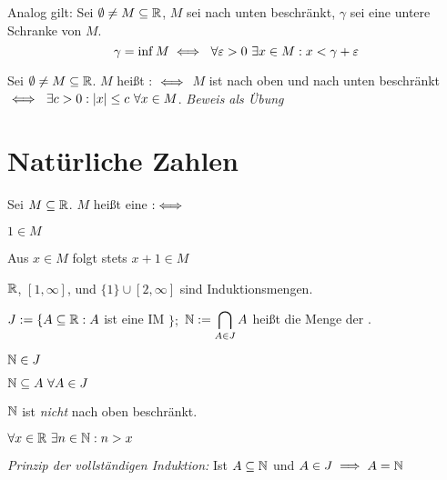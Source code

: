 \documentclass[a4paper,twoside,DIV15,BCOR12mm]{scrbook}
\begin{document}
Analog gilt: Sei $\emptyset \ne M \subseteq \mathbb{R}$, $M$ sei nach unten beschränkt, $\gamma$ sei eine untere Schranke von $M$.
\[ \gamma = \inf{M} \equizu \ \forall\varepsilon > 0 \ \exists x \in M: x < \gamma + \varepsilon \]

\begin{definition}
Sei $\emptyset \ne M \subseteq \mathbb{R}$. $M$ heißt : $\iff$ $M$ ist nach oben und nach unten beschränkt $\iff \ \exists c > 0: |x| \le c \ \forall x\in M$. \textit{Beweis als Übung}
\end{definition}

\chapter{Natürliche Zahlen}

\begin{definition}[Induktionsmengen]
Sei $M \subseteq \mathbb{R}$. $M$ heißt eine   $:\iff$
\begin{liste}
\item $1 \in M$
\item Aus $x \in M$ folgt stets $x+1 \in M$
\end{liste}
\end{definition}

\begin{beispiel} $\mathbb{R}$, $[1,\infty]$, und $\{1\} \cup [2,\infty]$ sind Induktionsmengen.

$J:=\{A \subseteq \mathbb{R}: A$ ist eine IM $\};$ $\mathbb{N} := \displaystyle\bigcap_{ A\in J} A$  heißt die Menge der .
\end{beispiel}

\begin{satz}[Induktionsmengen]
\begin{liste}
\item $\mathbb{N} \in J$
\item $\mathbb{N} \subseteq A \ \forall A \in J$
\item $\mathbb{N}$ ist \textit{nicht} nach oben beschränkt.
\item $\forall x  \in \mathbb{R} \ \exists n \in \mathbb{N}: n > x $
\item \textit{Prinzip der vollständigen Induktion:} Ist $A \subseteq \mathbb{N}$ und $A \in J\implies A = \mathbb{N}$
\end{liste}
\end{satz}
\end{document}
